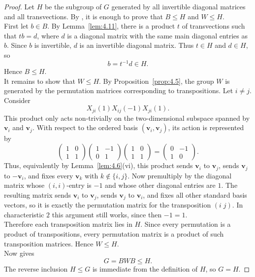 \documentclass[../Odyssey_Project.tex]{subfiles}
\begin{document}
\begin{proof}
Let $H$ be the subgroup of $G$ generated by all invertible diagonal matrices and all transvections. By , it is enough to prove that $B\leq H$ and $W\leq H$.\\
First let $b\in B$. By Lemma~\ref{lem:4.11}, there is a product $t$ of transvections such that $tb=d$, where $d$ is a diagonal matrix with the same main diagonal entries as $b$. Since $b$ is invertible, $d$ is an invertible diagonal matrix. Thus $t\in H$ and $d\in H$, so
\[
    b=t^{-1}d\in H.
\]
Hence $B\leq H$.\\
It remains to show that $W\leq H$. By Proposition~\ref{prop:4.5}, the group $W$ is generated by the permutation matrices corresponding to transpositions. Let $i\neq j$. Consider
\[
    X_{ji}(1)X_{ij}(-1)X_{ji}(1).
\]
This product only acts non-trivially on the two-dimensional subspace spanned by $\mathbf{v}_i$ and $\mathbf{v}_j$. With respect to the ordered basis $(\mathbf{v}_i,\mathbf{v}_j)$, its action is represented by
\[
    \begin{pmatrix}
        1 & 0\\
        1 & 1
    \end{pmatrix}
    \begin{pmatrix}
        1 & -1\\
        0 & 1
    \end{pmatrix}
    \begin{pmatrix}
        1 & 0\\
        1 & 1
    \end{pmatrix}
    =
    \begin{pmatrix}
        0 & -1\\
        1 & 0
    \end{pmatrix}.
\]
Thus, equivalently by Lemma~\ref{lem:4.6}(vi), this product sends $\mathbf{v}_i$ to $\mathbf{v}_j$, sends $\mathbf{v}_j$ to $-\mathbf{v}_i$, and fixes every $\mathbf{v}_k$ with $k\notin\{i,j\}$. Now premultiply by the diagonal matrix whose $(i,i)$-entry is $-1$ and whose other diagonal entries are $1$. The resulting matrix sends $\mathbf{v}_i$ to $\mathbf{v}_j$, sends $\mathbf{v}_j$ to $\mathbf{v}_i$, and fixes all other standard basis vectors, so it is exactly the permutation matrix for the transposition $(i\;j)$. In characteristic $2$ this argument still works, since then $-1=1$.\\
Therefore each transposition matrix lies in $H$. Since every permutation is a product of transpositions, every permutation matrix is a product of such transposition matrices. Hence $W\leq H$.\\
Now  gives
\[
    G=BWB\leq H.
\]
The reverse inclusion $H\leq G$ is immediate from the definition of $H$, so $G=H$.
\end{proof}
\end{document}
